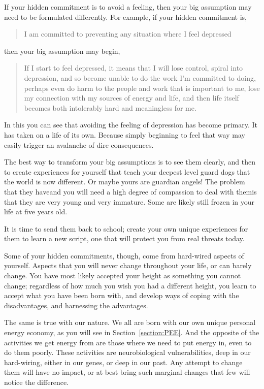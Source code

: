 If your hidden commitment is to avoid a feeling, then your big assumption may need to be formulated differently. For example, if your hidden commitment is, 


\begin{quote} 
I am committed to preventing any situation where I feel depressed
\end{quote} 


then your big assumption may begin, 


\begin{quote}
If I start to feel depressed, it means that I will lose control, spiral into depression, and so become unable to do the work I'm committed to doing, perhaps even do harm to the people and work that is important to me, lose my connection with my sources of energy and life, and then life itself becomes both intolerably hard and meaningless for me.
\end{quote}


In this you can see that avoiding the feeling of depression has become primary. It has taken on a life of its own. Because simply beginning to feel that way may easily trigger an avalanche of dire consequences. 


The best way to transform your big assumptions is to see them clearly, and then to create experiences for yourself that teach your deepest level guard dogs that the world is now different. Or maybe yours are guardian angels! The problem that they have\textemdash and you will need a high degree of compassion to deal with them\textemdash is that they are very young and very immature. Some are likely still frozen in your life at five years old. 


It is time to send them back to school; create your own unique experiences for them to learn a new script, one that will protect you from real threats today.


Some of your hidden commitments, though, come from hard-wired aspects of yourself. Aspects that you will never change throughout your life, or can barely change. You have most likely accepted your height as something you cannot change; regardless of how much you wish you had a different height, you learn to accept what you have been born with, and develop ways of coping with the disadvantages, and harnessing the advantages.


The same is true with our nature. We all are born with our own unique personal energy economy, as you will see in Section~\ref{section:PEE}. And the opposite of the activities we get energy from are those where we need to put energy in, even to do them poorly. These activities are neurobiological vulnerabilities, deep in our hard-wiring, either in our genes, or deep in our past. Any attempt to change them will have no impact, or at best bring such marginal changes that few will notice the difference. 


